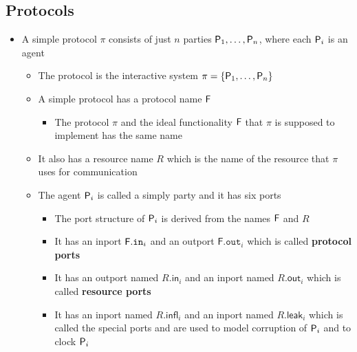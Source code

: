 \subsection{Protocols}
\begin{itemize}
  \item A simple protocol $\pi$ consists of just $n$ parties $\P_1, \dots, \P_n$, where each $\P_i$ is an agent
  \begin{itemize}
  	\item The protocol is the interactive system $\pi = \{\P_1, \dots, \P_n\}$
  	\item A simple protocol has a protocol name $\F$
    \begin{itemize}
  		\item The protocol $\pi$ and the ideal functionality $\F$ that $\pi$ is supposed to implement has the same name
    \end{itemize}
  	\item It also has a resource name $R$ which is the name of the resource that $\pi$ uses for communication
  	\item The agent $\P_i$ is called a simply party and it has six ports 
    \begin{itemize}
  		\item The port structure of $\P_i$ is derived from the names $\F$ and $R$
  		\item It has an inport $\F.\mathtt{in}_i$ and an outport $\mathsf{F}.\mathtt{out}_i$ which is called \textbf{protocol ports}

  		\item It has an outport named $R.\mathsf{in}_i$ and an inport named $R.\mathsf{out}_i$ which is called \textbf{resource ports}
  		\item It has an inport named $R.\mathsf{infl}_i$ and an inport named $R.\mathsf{leak}_i$ which is called the special ports and are used to model corruption of $\P_i$ and to clock $\P_i$
    \end{itemize}
  \end{itemize} 


\end{itemize}
